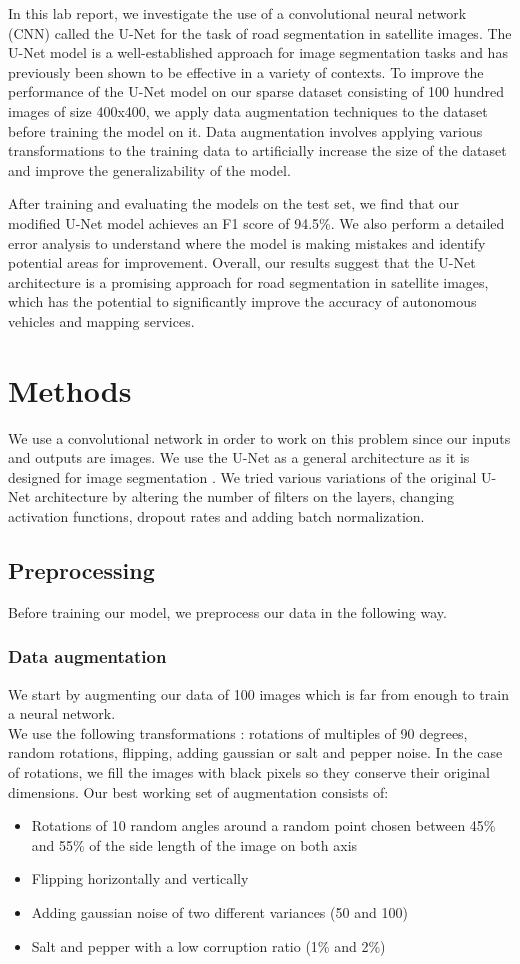 \documentclass[10pt,conference,compsocconf]{IEEEtran}
\begin{document}
In this lab report, we investigate the use of a convolutional neural network (CNN) called the U-Net for the task of road segmentation in satellite images. The U-Net model is a well-established approach for image segmentation tasks and has previously been shown to be effective in a variety of contexts. To improve the performance of the U-Net model on our sparse dataset consisting of 100 hundred images of size 400x400, we apply data augmentation techniques to the dataset before training the model on it. Data augmentation involves applying various transformations to the training data to artificially increase the size of the dataset and improve the generalizability of the model.

After training and evaluating the models on the test set, we find that our modified U-Net model achieves an F1 score of 94.5\%. We also perform a detailed error analysis to understand where the model is making mistakes and identify potential areas for improvement. Overall, our results suggest that the U-Net architecture is a promising approach for road segmentation in satellite images, which has the potential to significantly improve the accuracy of autonomous vehicles and mapping services.

\section{Methods}
We use a convolutional network in order to work on this problem since our inputs and outputs are images. We use the U-Net as a general architecture as it is designed for image segmentation \cite{wiki:u-net}. We tried various variations of the original U-Net architecture by altering the number of filters on the layers, changing activation functions, dropout rates and adding batch normalization.
\subsection{Preprocessing}
\label{preprocess}
Before training our model, we preprocess our data in the following way.
\subsubsection{Data augmentation}
We start by augmenting our data of 100 images which is far from enough to train a neural network.\\
We use the following transformations : rotations of multiples of 90 degrees, random rotations, flipping, adding gaussian or salt and pepper noise. In the case of rotations, we fill the images with black pixels so they conserve their original dimensions. Our best working set of augmentation consists of:
\begin{itemize}
\item Rotations of 10 random angles around a random point chosen between 45\% and 55\% of the side length of the image on both axis
\item Flipping horizontally and vertically
\item Adding gaussian noise of two different variances (50 and 100)
\item Salt and pepper with a low corruption ratio (1\% and 2\%)
\end{itemize}
\end{document}
